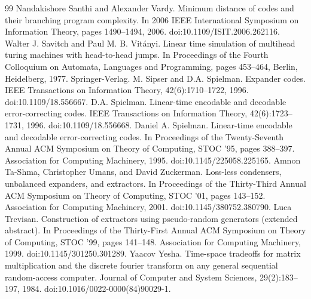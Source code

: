 \documentclass[10pt,a4paper]{article}
\begin{document}
\begin{thebibliography}{99}
 Nandakishore Santhi and Alexander Vardy. Minimum distance of codes and their branching program complexity. In 2006 IEEE International Symposium on Information Theory, pages 1490–1494, 2006. doi:10.1109/ISIT.2006.262116.
 Walter J. Savitch and Paul M. B. Vitányi. Linear time simulation of multihead turing machines with head-to-head jumps. In Proceedings of the Fourth Colloquium on Automata, Languages and Programming, pages 453–464, Berlin, Heidelberg, 1977. Springer-Verlag.
 M. Sipser and D.A. Spielman. Expander codes. IEEE Transactions on Information Theory, 42(6):1710–1722, 1996. doi:10.1109/18.556667.
 D.A. Spielman. Linear-time encodable and decodable error-correcting codes. IEEE Transactions on Information Theory, 42(6):1723–1731, 1996. doi:10.1109/18.556668.
 Daniel A. Spielman. Linear-time encodable and decodable error-correcting codes. In Proceedings of the Twenty-Seventh Annual ACM Symposium on Theory of Computing, STOC ’95, pages 388–397. Association for Computing Machinery, 1995. doi:10.1145/225058.225165.
 Amnon Ta-Shma, Christopher Umans, and David Zuckerman. Loss-less condensers, unbalanced expanders, and extractors. In Proceedings of the Thirty-Third Annual ACM Symposium on Theory of Computing, STOC ’01, pages 143–152. Association for Computing Machinery, 2001. doi:10.1145/380752.380790.
 Luca Trevisan. Construction of extractors using pseudo-random generators (extended abstract). In Proceedings of the Thirty-First Annual ACM Symposium on Theory of Computing, STOC ’99, pages 141–148. Association for Computing Machinery, 1999. doi:10.1145/301250.301289.
 Yaacov Yesha. Time-space tradeoffs for matrix multiplication and the discrete fourier transform on any general sequential random-access computer. Journal of Computer and System Sciences, 29(2):183–197, 1984. doi:10.1016/0022-0000(84)90029-1.
\end{thebibliography}
\end{document}
